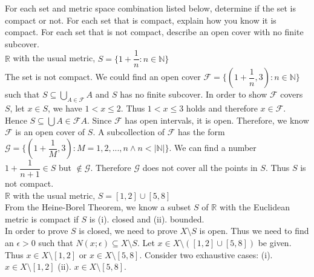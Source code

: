 \documentclass{article}
\begin{document}
	
	For each set and metric space combination listed below, determine if the set is compact or not. For each set
	that is compact, explain how you know it is compact. For each set that is not compact, describe an open
	cover with no finite subcover.\\
	
	\noindent $\mathbb{R}$ with the usual metric, $S = \{1+\dfrac{1}{n}:n \in \mathbb{N}\}$\\
	
	The set is not compact. We could find an open cover $\mathcal{F} = \{(1+\dfrac{1}{n},3):n \in \mathbb{N}\}$ such that $S \subseteq \bigcup_{A \in \mathcal{F}} A$ and $S$ has no finite subcover. In order to show $\mathcal{F}$ covers $S$, let $x \in S$, we have $1<x\leq 2$. Thus $1<x\leq 3$ holds and therefore $x \in \mathcal{F}$. Hence $S \subseteq \bigcup{A \in \mathcal{F}} A$. Since $\mathcal{F}$ has open intervals, it is open. Therefore, we know $\mathcal{F}$ is an open cover of $S$. A subcollection of $\mathcal{F}$ has the form $\mathcal{G} = \{(1+\dfrac{1}{M},3):M=1,2,...,n \land n<|\mathbb{N}|\}$. We can find a number $1+\dfrac{1}{n+1} \in S$ but $\notin \mathcal{G}$. Therefore $\mathcal{G}$ does not cover all the points in $S$. Thus $S$ is not compact. \\
	
	\noindent $\mathbb{R}$ with the usual metric, $S = [1, 2] \cup [5, 8]$\\
	
	From the Heine-Borel Theorem, we know a subset $S$ of $\mathbb{R}$ with the Euclidean metric is compact if $S$ is (i). closed and (ii). bounded.\\
	
	In order to prove $S$ is closed, we need to prove $X \setminus S$ is open. Thus we need to find an $\epsilon > 0$ such that $N(x;\epsilon) \subseteq X \setminus S$. Let $x \in X \setminus ([1,2] \cup [5,8])$ be given. Thus $x \in X \setminus [1,2]$ or $x \in X \setminus [5,8]$. Consider two exhaustive cases: (i). $x \in X \setminus [1,2]$ (ii). $x \in X \setminus [5,8]$.\\
	
\end{document}
